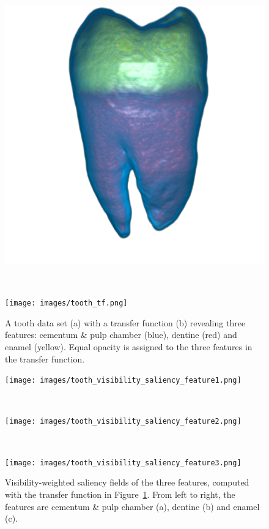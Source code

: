 \begin{figure}
	\centering
	\begin{minipage}{.6\textwidth}
		\includegraphics[width=1\linewidth]{images/tooth_naive.png}
		\subcaption{}
	\end{minipage}~
	\begin{minipage}{.3\textwidth}
		\texttt{[image: images/tooth\_tf.png]}
		\subcaption{}
	\end{minipage}
	\caption{A tooth data set (a) with a transfer function (b) revealing three features: cementum \& pulp chamber (blue), dentine (red) and enamel (yellow). Equal opacity is assigned to the three features in the transfer function.}
	\label{fig:tooth}
\end{figure}

\begin{figure}
	\centering
	\begin{minipage}{.3\textwidth}
		\texttt{[image: images/tooth\_visibility\_saliency\_feature1.png]}
		\subcaption{}
	\end{minipage}~
	\begin{minipage}{.3\textwidth}
		\texttt{[image: images/tooth\_visibility\_saliency\_feature2.png]}
		\subcaption{}
	\end{minipage}~
	\begin{minipage}{.3\textwidth}
		\texttt{[image: images/tooth\_visibility\_saliency\_feature3.png]}
		\subcaption{}
	\end{minipage}
	\caption{Visibility-weighted saliency fields of the three features, computed with the transfer function in Figure~\ref{fig:tooth}. From left to right, the features are cementum \& pulp chamber (a), dentine (b) and enamel (c).}
	\label{fig:tooth_saliency_field}
\end{figure}


